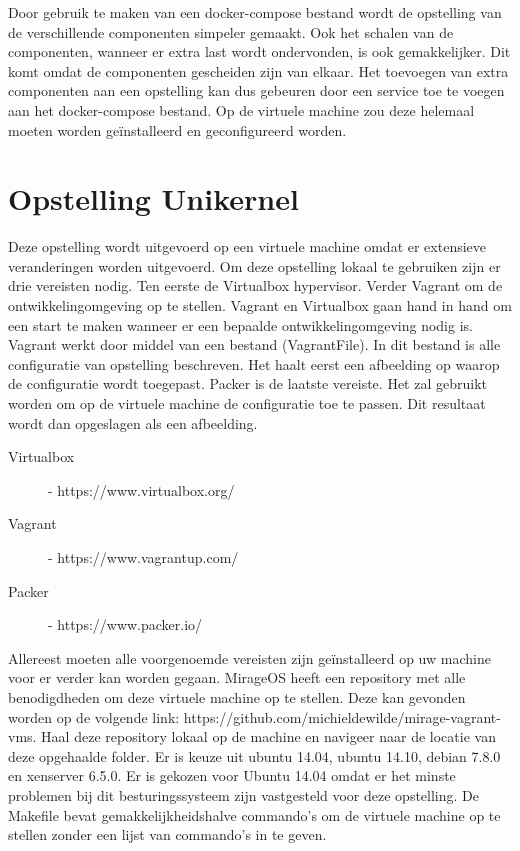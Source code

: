 Door gebruik te maken van een docker-compose bestand wordt de opstelling van de verschillende componenten simpeler gemaakt. Ook het schalen van de componenten, wanneer er extra last wordt ondervonden, is ook gemakkelijker. Dit komt omdat de componenten gescheiden zijn van elkaar. Het toevoegen van extra componenten aan een opstelling kan dus gebeuren door een service toe te voegen aan het docker-compose bestand. Op de virtuele machine zou deze helemaal moeten worden geïnstalleerd en geconfigureerd worden. 

\section{Opstelling Unikernel}

Deze opstelling wordt uitgevoerd op een virtuele machine omdat er extensieve veranderingen worden uitgevoerd. Om deze opstelling lokaal te gebruiken zijn er drie vereisten nodig. Ten eerste de Virtualbox hypervisor. Verder Vagrant om de ontwikkelingomgeving op te stellen. Vagrant en Virtualbox gaan hand in hand om een start te maken wanneer er een bepaalde ontwikkelingomgeving nodig is. Vagrant werkt door middel van een bestand (VagrantFile). In dit bestand is alle configuratie van opstelling beschreven. Het haalt eerst een afbeelding op waarop de configuratie wordt toegepast. Packer is de laatste vereiste. Het zal gebruikt worden om op de virtuele machine de configuratie toe te passen. Dit resultaat wordt dan opgeslagen als een afbeelding.

\begin{description}
\item [Virtualbox] - https://www.virtualbox.org/
\item [Vagrant] - https://www.vagrantup.com/
\item [Packer] - https://www.packer.io/ 
\end{description}

Allereest moeten alle voorgenoemde vereisten zijn geïnstalleerd op uw machine voor er verder kan worden gegaan. MirageOS heeft een repository met alle benodigdheden om deze virtuele machine op te stellen. Deze kan gevonden worden op de volgende link: https://github.com/michieldewilde/mirage-vagrant-vms. Haal deze repository lokaal op de machine en navigeer naar de locatie van deze opgehaalde folder. Er is keuze uit ubuntu 14.04, ubuntu 14.10, debian 7.8.0 en xenserver 6.5.0. Er is gekozen voor Ubuntu 14.04 omdat er het minste problemen bij dit besturingssysteem zijn vastgesteld voor deze opstelling. De Makefile bevat gemakkelijkheidshalve commando's om de virtuele machine op te stellen zonder een lijst van commando's in te geven.

